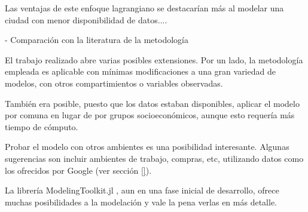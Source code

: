 Las ventajas de este enfoque lagrangiano se destacarían más al modelar una ciudad con menor disponibilidad de datos....



- Comparación con la literatura de la metodología 



El trabajo realizado abre varias posibles extensiones. Por un lado, la metodología empleada es aplicable con mínimas modificaciones a una gran variedad de modelos, con otros compartimientos o variables observadas.

También era posible, puesto que los datos estaban disponibles, aplicar el modelo por comuna en lugar de por grupos socioeconómicos, aunque esto requería más tiempo de cómputo. 

Probar el modelo con otros ambientes es una posibilidad interesante. Algunas sugerencias son incluir ambientes de trabajo, compras, etc, utilizando datos como los ofrecidos por Google (ver sección \ref{}).

La librería ModelingToolkit.jl \cite{}, aun en una fase inicial de desarrollo, ofrece muchas posibilidades a la modelación y vale la pena verlas en más detalle.
